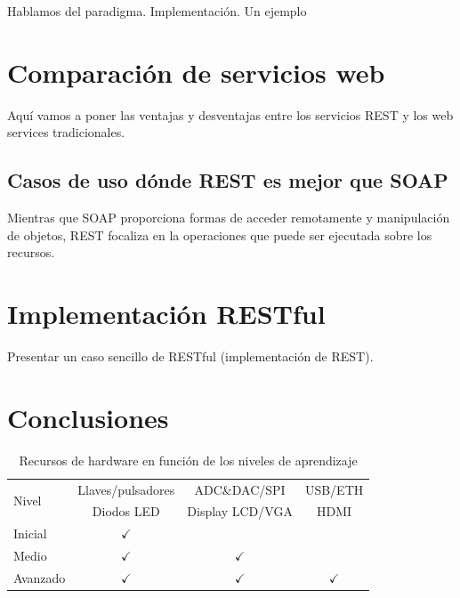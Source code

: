 \documentclass[conference]{IEEEtran}
\begin{document}
Hablamos del paradigma. Implementación. Un ejemplo

\lipsum[1]

\section{Comparación de servicios web}
\label{sec:comparacion}

Aquí vamos a poner las ventajas y desventajas entre los servicios REST
y los web services tradicionales.

\subsection{Casos de uso dónde REST es mejor que SOAP}
\label{sec:cu-rest-better-soap}

Mientras que SOAP proporciona formas de acceder remotamente y
manipulación de objetos, REST focaliza en la operaciones que puede ser
ejecutada sobre los recursos. 

\section{Implementación RESTful}
\label{sec:imp-rest}

Presentar un caso sencillo de RESTful (implementación de REST).

\lipsum[3]


\section{Conclusiones}
\label{sec:con}


\begin{table}[!t]
\renewcommand{\arraystretch}{1.3}
\caption{Recursos de hardware en función de los niveles de aprendizaje}
\label{tab:rec-plataforma}
\centering
\begin{tabular}{|l|c|c|c|}
\hline
\multirow{2}{*}{Nivel} & Llaves/pulsadores & ADC\&DAC/SPI & USB/ETH \\
                       & Diodos LED & Display LCD/VGA & HDMI \\
\hline
Inicial & $\checkmark$ & & \\
\hline
Medio & $\checkmark$ & $\checkmark$ & \\
\hline
Avanzado & $\checkmark$ & $\checkmark$ & $\checkmark$ \\
\hline
\end{tabular}
\end{table}
\end{document}

